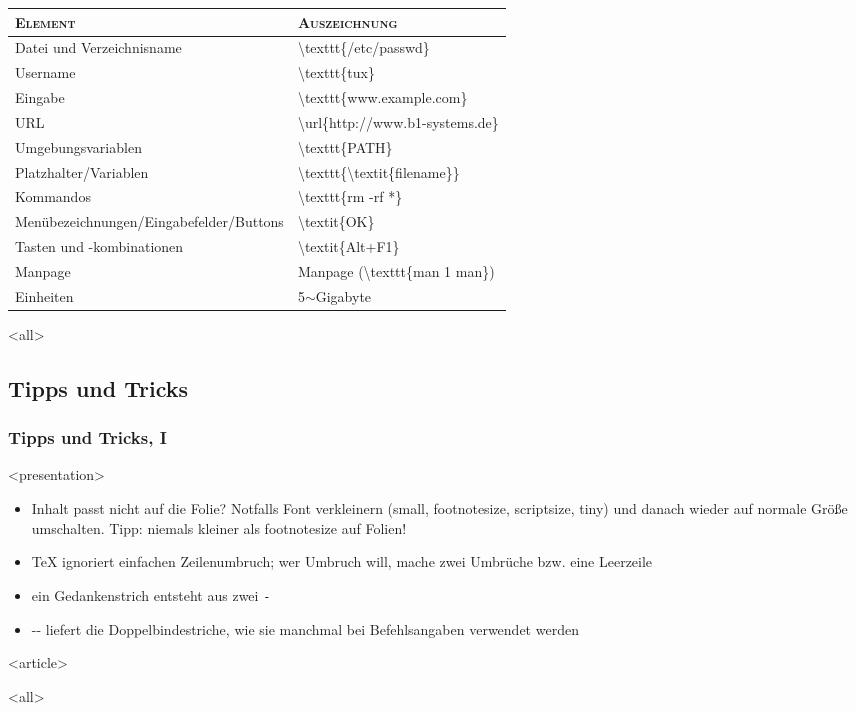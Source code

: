 \begin{frame}[fragile]
\begin{tabularx}{\textwidth}{|l|X|}
\hline
\textsc{\textbf{Element}} & \textsc{\textbf{Auszeichnung}}\\
\hline
\hline
Datei und Verzeichnisname & \textbackslash texttt\{/etc/passwd\}\\
Username & \textbackslash texttt\{tux\} \\
Eingabe & \textbackslash texttt\{www.example.com\} \\
URL & \textbackslash url\{http://www.b1-systems.de\} \\
Umgebungsvariablen & \textbackslash texttt\{PATH\} \\
Platzhalter/Variablen & \textbackslash texttt\{\textbackslash textit\{filename\}\} \\
Kommandos & \textbackslash texttt\{rm -rf *\} \\
Menübezeichnungen/Eingabefelder/Buttons & \textbackslash textit\{OK\} \\
Tasten und -kombinationen & \textbackslash textit\{Alt+F1\} \\
Manpage & Manpage (\textbackslash texttt\{man 1 man\})\\
Einheiten & 5$\sim$Gigabyte \\
\hline
\end{tabularx}


\mode
<all>

\end{frame}
\newpage

\subsection{Tipps und Tricks}
\begin{frame}
\frametitle<presentation>{Tipps und Tricks, I}


\mode
<presentation>
\begin{itemize}
\item Inhalt passt nicht auf die Folie? Notfalls Font verkleinern (small, footnotesize, scriptsize, tiny) und danach wieder auf normale Größe umschalten. Tipp: niemals kleiner als footnotesize auf Folien!
\item TeX ignoriert einfachen Zeilenumbruch; wer Umbruch will, mache zwei Umbrüche bzw. eine Leerzeile
\item ein Gedankenstrich entsteht aus zwei \texttt{-}
\item -{}- liefert die Doppelbindestriche, wie sie manchmal bei Befehlsangaben verwendet werden
\end{itemize}


\mode
<article>

\mode
<all>

\end{frame}
\newpage

